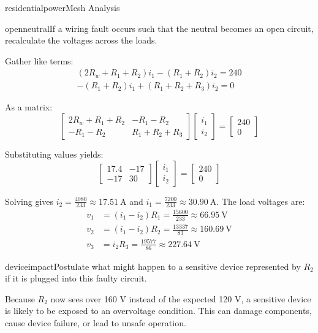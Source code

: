 \begin{mainquestion}{residentialpower}{Mesh Analysis}
\begin{partquestion}{openneutral}{If a wiring fault occurs such that the neutral becomes an open circuit, recalculate the voltages across the loads.}
\begin{answer}
Gather like terms:
\begin{gather*}
(2R_w + R_1 + R_2)i_1 - (R_1 + R_2)i_2 = 240 \\
- (R_1 + R_2)i_1 + (R_1 + R_2 + R_3)i_2 = 0
\end{gather*}

As a matrix:
\[
\begin{bmatrix}
2R_w + R_1 + R_2 & -R_1 -R_2\\
-R_1 -R_2 & R_1 + R_2 + R_3
\end{bmatrix}
\begin{bmatrix}
i_1 \\
i_2
\end{bmatrix}
=
\begin{bmatrix}
240 \\
0
\end{bmatrix}
\]

Substituting values yields:
\[
\begin{bmatrix}
17.4 & -17\\
-17 & 30
\end{bmatrix}
\begin{bmatrix}
i_1 \\
i_2
\end{bmatrix}
=
\begin{bmatrix}
240 \\
0
\end{bmatrix}
\]

Solving gives $i_{2} = \frac{4080}{233} \approx \qty{17.51}{\ampere}$ and $i_{1} = \frac{7200}{233} \approx \qty{30.90}{\ampere}$. The load voltages are:
\begin{align*}
v_{1} &= (i_{1}-i_{2})R_1 = \frac{15600}{233} \approx \qty{66.95}{\volt} \\
v_{2} &= (i_{1}-i_{2})R_2 = \frac{13337}{83} \approx \qty{160.69}{\volt} \\
v_{3} &= i_{2} R_3 = \frac{19577}{86} \approx \qty{227.64}{\volt}
\end{align*}
\end{answer}
\end{partquestion}

\begin{partquestion}{deviceimpact}{Postulate what might happen to a sensitive device represented by $R_{2}$ if it is plugged into this faulty circuit.}
\begin{answer}
Because $R_{2}$ now sees over 160 V instead of the expected 120 V, a sensitive device is likely to be exposed to an overvoltage condition. This can damage components, cause device failure, or lead to unsafe operation.
\end{answer}
\end{partquestion}

\end{mainquestion}
